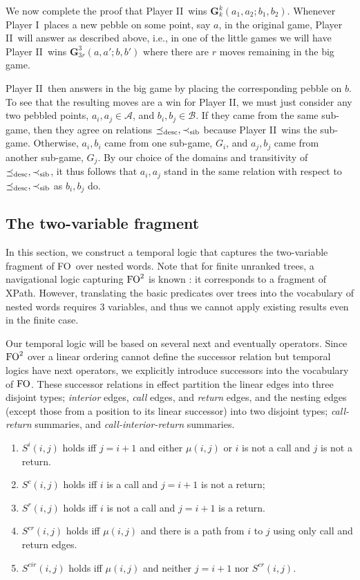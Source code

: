 \documentclass{LMCS}
\newcommand{\dupl}{Player II}
\newcommand{\spoiler}{Player I}
\newcommand{\M}{{\mu}}
\newcommand{\desc}{\preceq_{\rm desc}}\newcommand{\sib}{\preceq_{\rm sib}}\newcommand{\lsib}{\prec_{\rm sib}}
\newcommand{\A}{{\mathcal{A}}}
\newcommand{\B}{{\mathcal{B}}}
\newcommand{\G}{{\mathbf G}}
\newcommand{\FO}{{\rm FO}}
\theoremstyle{plain}
\theoremstyle{definition}
\begin{document}
We now complete the proof that \dupl\ wins $\G^k_k(a_1,a_2;b_1,b_2)$.
Whenever \spoiler\ places a new pebble on some point, say $a$, in the
original game, \dupl\ will answer as described above, i.e., in one of
the little games we will have \dupl\ wins $\G^3_{3r} (a,a';b,b')$ where
there are $r$ moves remaining in the big game.

\dupl\ then answers in the big game by placing the corresponding
pebble on $b$.  To see that the resulting moves are a win for \dupl,
we must just consider  any two pebbled points, $a_i,a_j\in \A$, and
$b_i,b_j\in \B$.  If they came from the same sub-game, then they agree
on relations $\desc,\lsib$ because \dupl\ wins the sub-game.  Otherwise,
$a_i,b_i$ came from one sub-game, $G_i$, and 
$a_j,b_j$ came from another sub-game, $G_j$.  By our choice of the
domains and transitivity of $\desc,\lsib$, it thus follows that $a_i,a_j$
stand in the same relation with respect to $\desc,\lsib$ as $b_i,b_j$ do.





\subsection{The two-variable fragment}
In this section, we construct a temporal logic that captures the two-variable
fragment of \FO\ over nested words. 
Note that for finite unranked trees, a navigational
logic capturing $\FO^2$ is known \cite{marx-twovars,marx-tods}: it
corresponds to a fragment of XPath. However, translating the basic
predicates over trees into 
the vocabulary of nested words requires $3$ variables, and thus we
cannot apply existing results even in the finite case. 

Our temporal logic will be based on several next and eventually
operators. 
Since $\FO^2$ over a linear ordering cannot define the
successor relation but temporal logics have next operators, we
explicitly introduce successors into the vocabulary of
$\FO$.  
These successor relations in effect partition the linear edges into three 
disjoint types; {\em interior} edges, {\em call} edges, and {\em return} edges,
and the nesting edges
(except those from a position to its linear successor) into two disjoint types; 
{\em call-return\/} summaries, and {\em call-interior-return\/} summaries.


\begin{enumerate}[$\bullet$]
\item $S^i(i,j)$ holds iff $j=i+1$ and either $\M(i,j)$ or 
 $i$ is not a call and $j$ is not a   return.
\item $S^c(i,j)$ holds iff $i$ is a call and $j=i+1$ is not a return;
\item $S^r(i,j)$ holds iff $i$ is not a call and $j=i+1$ is a return.
\item $S^{cr}(i,j)$ holds iff $\M(i,j)$ and there is a path from $i$ to $j$ using only
call and return edges.
\item $S^{cir}(i,j)$ holds iff $\M(i,j)$ and neither $j=i+1$ nor $S^{cr}(i,j)$.
\end{enumerate} 
\end{document}
